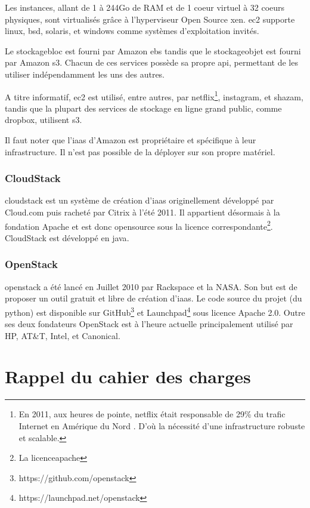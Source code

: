 \documentclass[a4paper,oneside]{report}
\begin{document}
Les instances, allant de 1 à 244Go de RAM et de 1 \gls{coeur} virtuel à 32 \glspl{coeur} physiques, sont virtualisés grâce à l'hyperviseur Open Source \gls{xen}.
\gls{ec2} supporte \gls{linux}, \gls{bsd}, \gls{solaris}, et \gls{windows} comme systèmes d'exploitation invités.

Le \gls{stockagebloc} est fourni par Amazon \gls{ebs} tandis que le \gls{stockageobjet} est fourni par Amazon \gls{s3}.
Chacun de ces services possède sa propre \gls{api}, permettant de les utiliser indépendamment les uns des autres.

A titre informatif, \gls{ec2} est utilisé, entre autres, par \gls{netflix}\footnote{En 2011, aux heures de pointe, \gls{netflix} était responsable de 29\% du trafic Internet en Amérique du Nord \cite{NetflixTrafic}. D'où la nécessité d'une infrastructure robuste et scalable.}, \gls{instagram}, et \gls{shazam}, tandis que la plupart des services de stockage en ligne grand public, comme \gls{dropbox}, utilisent \gls{s3}.

Il faut noter que l'\gls{iaas} d'Amazon est propriétaire et spécifique à leur infrastructure. Il n'est pas possible de la déployer sur son propre matériel.

\subsubsection{CloudStack}
\gls{cloudstack} est un système de création d'\gls{iaas} originellement développé par Cloud.com puis racheté par Citrix à l'été 2011.
Il appartient désormais à la fondation Apache et est donc \gls{opensource} sous la licence correspondante\footnote{La \gls{licenceapache}}.\newline
CloudStack est développé en \gls{java}.

\subsubsection{OpenStack}
\gls{openstack} a été lancé en Juillet 2010 par Rackspace et la NASA.
Son but est de proposer un outil gratuit et libre de création d'\gls{iaas}.
Le code source du projet (du \gls{python}) est disponible sur GitHub\footnote{https://github.com/openstack} et Launchpad\footnote{https://launchpad.net/openstack} sous licence Apache 2.0.\newline
Outre ses deux fondateurs OpenStack est à l'heure actuelle principalement utilisé par HP, AT\&T, Intel, et Canonical.

\section{Rappel du cahier des charges}
\end{document}
